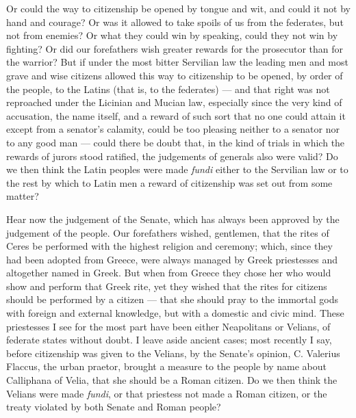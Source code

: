  Or could the way to citizenship be opened by tongue and wit, and could it not by hand and courage? Or was it allowed to take spoils of us from the federates, but not from enemies? Or what they could win by speaking, could they not win by fighting? Or did our forefathers wish greater rewards for the prosecutor than for the warrior? But if under the most bitter Servilian law the leading men and most grave and wise citizens allowed this way to citizenship to be opened, by order of the people, to the Latins (that is, to the federates) --- and that right was not reproached under the Licinian and Mucian law, especially since the very kind of accusation, the name itself, and a reward of such sort that no one could attain it except from a senator's calamity, could be too pleasing neither to a senator nor to any good man --- could there be doubt that, in the kind of trials in which the rewards of jurors stood ratified, the judgements of generals also were valid? Do we then think the Latin peoples were made \textit{fundi} either to the Servilian law or to the rest by which to Latin men a reward of citizenship was set out from some matter?

 Hear now the judgement of the Senate, which has always been approved by the judgement of the people. Our forefathers wished, gentlemen, that the rites of Ceres be performed with the highest religion and ceremony; which, since they had been adopted from Greece, were always managed by Greek priestesses and altogether named in Greek. But when from Greece they chose her who would show and perform that Greek rite, yet they wished that the rites for citizens should be performed by a citizen --- that she should pray to the immortal gods with foreign and external knowledge, but with a domestic and civic mind. These priestesses I see for the most part have been either Neapolitans or Velians, of federate states without doubt. I leave aside ancient cases; most recently I say, before citizenship was given to the Velians, by the Senate's opinion, C. Valerius Flaccus, the urban praetor, brought a measure to the people by name about Calliphana of Velia, that she should be a Roman citizen. Do we then think the Velians were made \textit{fundi}, or that priestess not made a Roman citizen, or the treaty violated by both Senate and Roman people?

